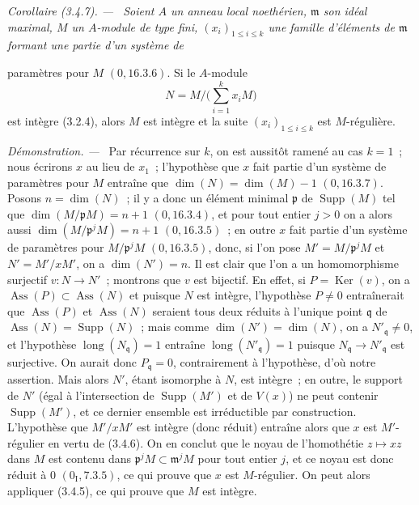 \documentclass[10pt,oneside]{book}
\newcommand{\oldpage}[2][]{%
  \setcounter{footnote}{0}%
  \marginpar{\scriptsize\textbf{#1}~|~#2}\ignorespaces}
\newenvironment{corollary}[1][]{%
  \par\medskip\noindent\itshape Corollaire (#1). ---\ }{\par}
\newenvironment{proof}{%
  \par\medskip\noindent\textit{Démonstration. ---\ }}{\par}
\begin{document}
\begin{corollary}[3.4.7]
\label{IV.2.3.4.7-fr}
Soient $A$ un anneau local noethérien, $\mathfrak m$ son idéal maximal, $M$ un
$A$-module de type fini, $(x_i)_{1\leqslant i\leqslant k}$ une famille
d'éléments de $\mathfrak m$ formant une partie d'un système de

\oldpage[IV-2]{51}

paramètres pour $M$ $(0,16.3.6)$. Si le $A$-module
\[
N=M\Big/\Big(\sum_{i=1}^k x_iM\Big)
\]
est intègre (3.2.4), alors $M$ est intègre et la suite
$(x_i)_{1\leqslant i\leqslant k}$ est $M$-régulière.
\end{corollary}

\begin{proof}
Par récurrence sur $k$, on est aussitôt ramené au cas $k=1$~; nous écrirons
$x$ au lieu de $x_1$~; l'hypothèse que $x$ fait partie d'un système de
paramètres pour $M$ entraîne que
$\dim(N)=\dim(M)-1$ $(0,16.3.7)$. Posons $n=\dim(N)$~; il y a donc un élément
minimal $\mathfrak p$ de $\operatorname{Supp}(M)$ tel que
$\dim(M/\mathfrak pM)=n+1$ $(0,16.3.4)$, et pour tout entier $j>0$ on a alors
aussi $\dim(M/\mathfrak p^jM)=n+1$ $(0,16.3.5)$~; en outre $x$ fait partie
d'un système de paramètres pour $M/\mathfrak p^jM$ $(0,16.3.5)$, donc, si
l'on pose $M'=M/\mathfrak p^jM$ et $N'=M'/xM'$, on a $\dim(N')=n$. Il est
clair que l'on a un homomorphisme surjectif $v:N\to N'$~; montrons que $v$ est
bijectif. En effet, si $P=\operatorname{Ker}(v)$, on a
$\operatorname{Ass}(P)\subset\operatorname{Ass}(N)$ et puisque $N$ est
intègre, l'hypothèse $P\neq0$ entraînerait que $\operatorname{Ass}(P)$ et
$\operatorname{Ass}(N)$ seraient tous deux réduits à l'unique point
$\mathfrak q$ de
$\operatorname{Ass}(N)=\operatorname{Supp}(N)$~; mais comme
$\dim(N')=\dim(N)$, on a $N'_{\mathfrak q}\neq0$, et l'hypothèse
$\operatorname{long}(N_{\mathfrak q})=1$ entraîne
$\operatorname{long}(N'_{\mathfrak q})=1$ puisque
$N_{\mathfrak q}\to N'_{\mathfrak q}$ est surjective. On aurait donc
$P_{\mathfrak q}=0$, contrairement à l'hypothèse, d'où notre assertion.
Mais alors $N'$, étant isomorphe à $N$, est intègre~; en outre, le support de
$N'$ (égal à l'intersection de $\operatorname{Supp}(M')$ et de $V(x)$) ne
peut contenir $\operatorname{Supp}(M')$, et ce dernier ensemble est
irréductible par construction. L'hypothèse que $M'/xM'$ est intègre (donc
réduit) entraîne alors que $x$ est $M'$-régulier en vertu de (3.4.6). On en
conclut que le noyau de l'homothétie $z\mapsto xz$ dans $M$ est contenu dans
$\mathfrak p^jM\subset\mathfrak m^jM$ pour tout entier $j$, et ce noyau est
donc réduit à $0$ $(0_{\mathrm I},7.3.5)$, ce qui prouve que $x$ est
$M$-régulier. On peut alors appliquer (3.4.5), ce qui prouve que $M$ est
intègre.
\end{proof}
\end{document}
